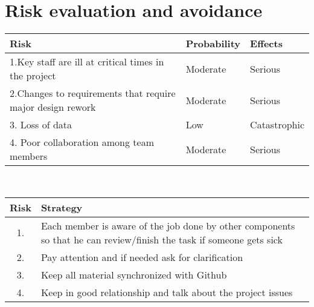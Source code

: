 \section {Risk evaluation and avoidance}
\begin{tabular}{  | l | l | l |}
    \hline
     Risk  & Probability  & Effects \\ \hline
    1.Key staff are ill at critical times in the project & Moderate & Serious  \\ \hline
    2.Changes to requirements that require major design rework & Moderate & Serious  \\ \hline
    3. Loss of data  & Low & Catastrophic \\ \hline
    4. Poor collaboration among team members & Moderate & Serious \\ \hline
\end{tabular}\\ 
\newline
\newline
\begin{tabular}{  | c |  p{14cm} |}
    \hline
    Risk  & Strategy \\ \hline
    1. & Each member is aware of the job done by other components so that he can review/finish the task if someone gets sick \\ \hline
    2. & Pay attention and if needed ask for clarification  \\ \hline
    3. & Keep all material synchronized with Github \\ \hline
    4. & Keep in good relationship and talk about the project issues \\ \hline
\end{tabular}